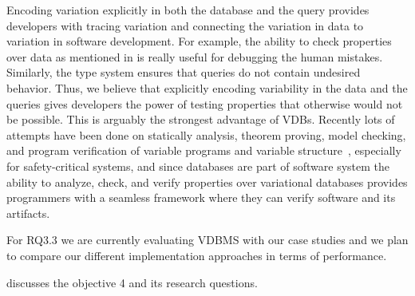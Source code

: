  
%
%
Encoding variation explicitly in both the database and the query
provides developers with tracing variation and connecting
the variation in data to variation in software development.
For example,
the ability to check properties over data as mentioned in
 is really useful for debugging the
human mistakes. Similarly, the type system ensures that 
queries do not contain undesired behavior. 
%
Thus, we believe that explicitly
encoding variability in the data and the queries gives developers the 
power of testing properties that otherwise would not be possible. 
This is arguably the strongest advantage of VDBs. Recently
lots of attempts have been done
on statically analysis, theorem proving, model checking, and program verification
of variable programs and 
variable structure~\cite{brkts20vamos, bks11fvoos, ldl07jss, tmbhvs14}, especially 
for safety-critical systems,
 and since databases are part of 
software system the ability to analyze, check, and verify 
properties over variational databases provides programmers
with a seamless framework where they can verify software
and its artifacts.
%



For RQ3.3 we are currently evaluating VDBMS with our case studies and we plan
to compare our different implementation approaches in terms of performance.
 
 discusses the objective 4 and its research questions.
 
%
%
%
%